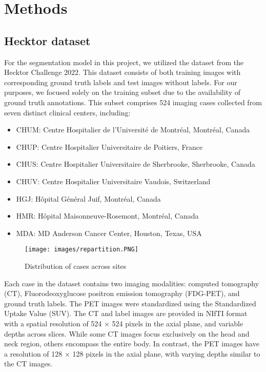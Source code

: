 \chapter{Methods}
\section{Hecktor dataset}
For the segmentation model in this project, we utilized the dataset from the Hecktor Challenge 2022. This dataset consists of both training images with corresponding ground truth labels and test images without labels. For our purposes, we focused solely on the training subset due to the availability of ground truth annotations. This subset comprises 524 imaging cases collected from seven distinct clinical centers, including:

\begin{itemize}
    \setlength\itemsep{1pt}
    \setlength\parskip{0pt}
    \setlength\topsep{0pt}
    \item CHUM: Centre Hospitalier de l’Université de Montréal, Montréal, Canada
    \item CHUP: Centre Hospitalier Universitaire de Poitiers, France
    \item CHUS: Centre Hospitalier Universitaire de Sherbrooke, Sherbrooke, Canada
    \item CHUV: Centre Hospitalier Universitaire Vaudois, Switzerland
    \item HGJ: Hôpital Général Juif, Montréal, Canada
    \item HMR: Hôpital Maisonneuve-Rosemont, Montréal, Canada
    \item MDA: MD Anderson Cancer Center, Houston, Texas, USA
\end{itemize}
\begin{figure}[ht]
    \centering
    \texttt{[image: images/repartition.PNG]}
    \caption{Distribution of cases across sites}
\end{figure}
\newpage
Each case in the dataset contains two imaging modalities: computed tomography (CT), Fluorodeoxyglucose positron emission tomography (FDG-PET), and ground truth labels. The PET images were standardized using the Standardized Uptake Value (SUV). The CT and label images are provided in NIfTI format with a spatial resolution of 524 × 524 pixels in the axial plane, and variable depths across slices. While some CT images focus exclusively on the head and neck region, others encompass the entire body. In contrast, the PET images have a resolution of 128 × 128 pixels in the axial plane, with varying depths similar to the CT images.

